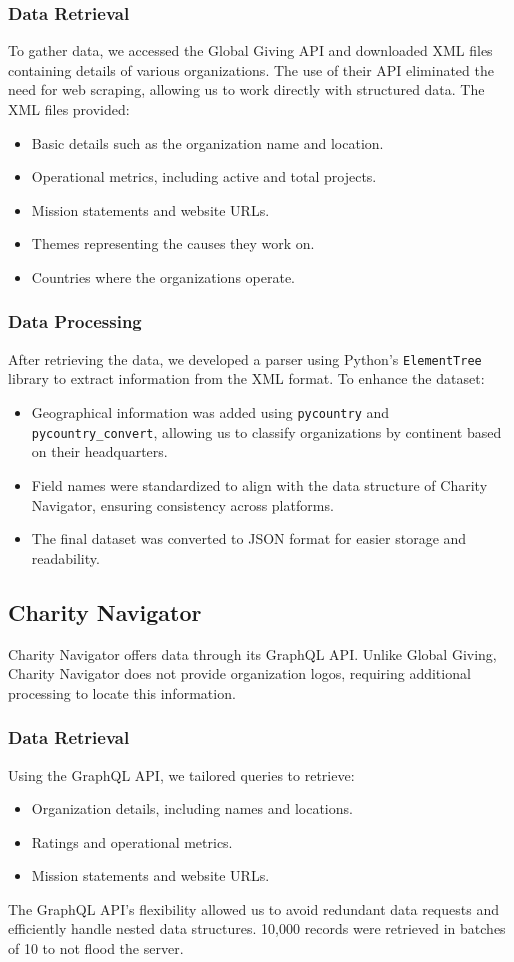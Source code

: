 \documentclass[unicode,9pt,a4paper,oneside,numbers=endperiod,openany]{scrartcl}
\begin{document}
\subsubsection{Data Retrieval}
To gather data, we accessed the Global Giving API and downloaded XML files containing details of various organizations. The use of their API eliminated the need for web scraping, allowing us to work directly with structured data. The XML files provided:
\begin{itemize}
\item Basic details such as the organization name and location.
\item Operational metrics, including active and total projects.
\item Mission statements and website URLs.
\item Themes representing the causes they work on.
\item Countries where the organizations operate.
\end{itemize}

\subsubsection{Data Processing}
After retrieving the data, we developed a parser using Python's \texttt{ElementTree} library to extract information from the XML format. To enhance the dataset:
\begin{itemize}
\item Geographical information was added using \texttt{pycountry} and \texttt{pycountry\_convert}, allowing us to classify organizations by continent based on their headquarters.
\item Field names were standardized to align with the data structure of Charity Navigator, ensuring consistency across platforms.
\item The final dataset was converted to JSON format for easier storage and readability.
\end{itemize}

\subsection{Charity Navigator}
Charity Navigator offers data through its GraphQL API. Unlike Global Giving, Charity Navigator does not provide organization logos, requiring additional processing to locate this information.

\subsubsection{Data Retrieval}
Using the GraphQL API, we tailored queries to retrieve:
\begin{itemize}
\item Organization details, including names and locations.
\item Ratings and operational metrics.
\item Mission statements and website URLs.
\end{itemize}
The GraphQL API's flexibility allowed us to avoid redundant data requests and efficiently handle nested data structures. 10,000 records were retrieved in batches of 10 to not flood the server.
\end{document}
